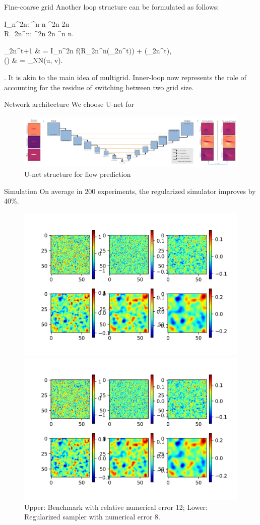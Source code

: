 \documentclass{beamer}
\begin{document}
\begin{frame}{Fine-coarse grid}
	Another loop structure can be formulated as follows:
	\bequn
	\begin{aligned}
	I_n^{2n}: \mbR^{n \times n} \rightarrow \mbR^{2n \times 2n}			\\
	R_{2n}^{n}: \mbR^{2n \times 2n} \rightarrow \mbR^{n \times n}.
	\end{aligned}
\eequn
	\bequ
	\lbb\begin{aligned}
		\mfu_{2n}^{t+1} & = I_n^{2n} \circ f(R_{2n}^{n}(\mfu_{2n}^t)) + \wht \mfR(\mfu_{2n}^t),		\\
		\wht \mfR(\mfu) & = \phi_{NN}(u, v).
	\end{aligned}\right.
\eequ
	It is akin to the main idea of multigrid. Inner-loop now represents the role of
	 accounting for the residue of switching between two grid size.
\end{frame}


\begin{frame}{Network architecture}
	We choose U-net for 
	\begin{figure}[H]
          \centering
          \centerline{\includegraphics[width=1.1\linewidth]{fig/Unet.png}}
          \caption{U-net structure for flow prediction\footnotemark}
\end{figure}
\end{frame}


\begin{frame}{Simulation}
	On average in $200$ experiments, the regularized simulator improves by 40\%.
	\begin{figure}[H]
          \centering
          \centerline{\includegraphics[width=0.4\linewidth]{fig/RD2-64-bm.jpg}}
          \centerline{\includegraphics[width=0.4\linewidth]{fig/RD2-64-reg.jpg}}
          \caption{Upper: Benchmark with relative numerical error 12; Lower:
					 Regularized sampler with numerical error 8.}
\end{figure}
\end{frame}
\end{document}
